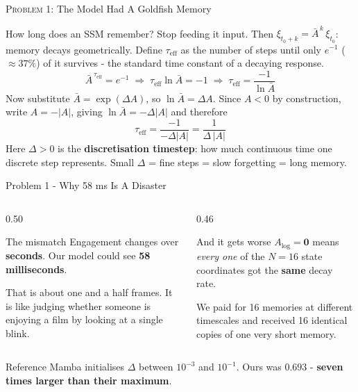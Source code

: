 \documentclass[aspectratio=169]{beamer}
\newcommand{\hl}[1]{\textcolor{coolpurple}{\textbf{#1}}}
\begin{document}

	\begin{frame}{\textsc{Problem 1:} The Model Had A Goldfish Memory}
		\begin{block}{How long does an SSM remember?}
			\small
			Stop feeding it input. Then $\xi_{t_0+k} = \bar{A}^{\,k}\,\xi_{t_0}$: memory decays
			geometrically. Define $\tau_{\text{eff}}$ as the number of steps until only $e^{-1}$
			($\approx 37\%$) of it survives - the standard time constant of a decaying response.
			$$ \bar{A}^{\,\tau_{\text{eff}}} = e^{-1}
			\;\Longrightarrow\; \tau_{\text{eff}}\ln\bar{A} = -1
			\;\Longrightarrow\; \tau_{\text{eff}} = \frac{-1}{\ln \bar{A}} $$
			Now substitute $\bar{A} = \exp(\Delta A)$, so $\ln\bar{A} = \Delta A$. Since $A < 0$ by
			construction, write $A = -|A|$, giving $\ln\bar{A} = -\Delta|A|$ and therefore
			$$ \tau_{\text{eff}} = \frac{-1}{-\Delta|A|} = \frac{1}{\Delta\,|A|} $$
			Here $\Delta > 0$ is the \hl{discretisation timestep}: how much continuous time one
			discrete step represents. Small $\Delta$ = fine steps = slow forgetting = long memory.
		\end{block}
	\end{frame}

	\begin{frame}{Problem 1 - Why 58 ms Is A Disaster}
		\begin{columns}[onlytextwidth]
			\begin{column}{0.50\textwidth}
				\begin{alertblock}{The mismatch}
					\small
					Engagement changes over \textbf{seconds}. Our model could see
					\textbf{58 milliseconds}.
					\vspace{0.4em}

					That is about one and a half frames. It is like judging whether someone is
					enjoying a film by looking at a single blink.
				\end{alertblock}
			\end{column}
			\begin{column}{0.46\textwidth}
				\begin{alertblock}{And it gets worse}
					\small
					$A_{\log} = \mathbf{0}$ means \emph{every one} of the $N = 16$ state
					coordinates got the \textbf{same} decay rate.
					\vspace{0.4em}

					We paid for 16 memories at different timescales and received
					16 identical copies of one very short memory.
				\end{alertblock}
			\end{column}
		\end{columns}
		\vspace{0.5em}
		\centering\small
		Reference Mamba initialises $\Delta$ between $10^{-3}$ and $10^{-1}$.
		Ours was $0.693$ - \hl{seven times larger than their maximum}.
	\end{frame}
\end{document}
